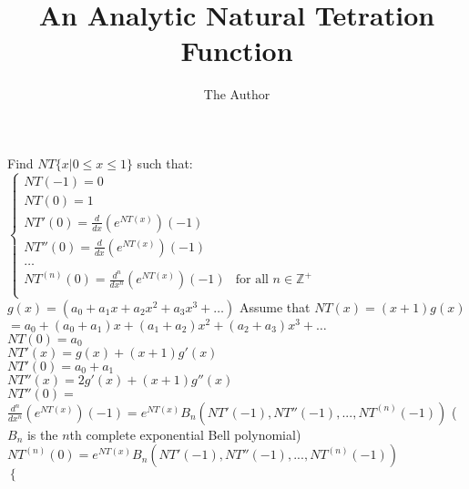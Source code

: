 \documentclass[11pt, oneside]{article}   	%
\title{An Analytic Natural Tetration Function}
\author{The Author}
\begin{document}
\maketitle

Find $NT \{x | 0 \leq x \leq 1\}$ such that:
$\begin{cases}
	NT(-1) = 0\\
	NT(0) = 1\\
	NT'(0) = \frac{d}{dx}({e^{NT(x)}})(-1)\\
	NT''(0) = \frac{d}{dx}({e^{NT(x)}})(-1)\\
	\dots\\
	NT^{(n)}(0) = \frac{d^n}{dx^n}({e^{NT(x)}})(-1)& \text{for all $n \in \mathbb{Z}^+$}\\
\end{cases}$\\
$g(x)=(a_0+a_1x+a_2x^2+a_3x^3+\dots)$
Assume that $NT(x) = (x+1)g(x)$\\
$=a_0+(a_0+a_1)x+(a_1+a_2)x^2+(a_2+a_3)x^3+\dots$\\
$NT(0)=a_0$\\
$NT'(x)=g(x)+(x+1)g'(x)$\\
$NT'(0)=a_0+a_1$\\
$NT''(x)=2g'(x)+(x+1)g''(x)$\\
$NT''(0)=$\\

$\frac{d^n}{dx^n}({e^{NT(x)}})(-1) = e^{NT(x)}B_n(NT'(-1),NT''(-1),...,NT^{(n)}(-1))$ ($B_n$ is the $n$th complete exponential Bell polynomial)\\
$NT^{(n)}(0) = e^{NT(x)}B_n(NT'(-1),NT''(-1),...,NT^{(n)}(-1))$\\

$\begin{cases}
\end{cases}$\\
\end{document}

